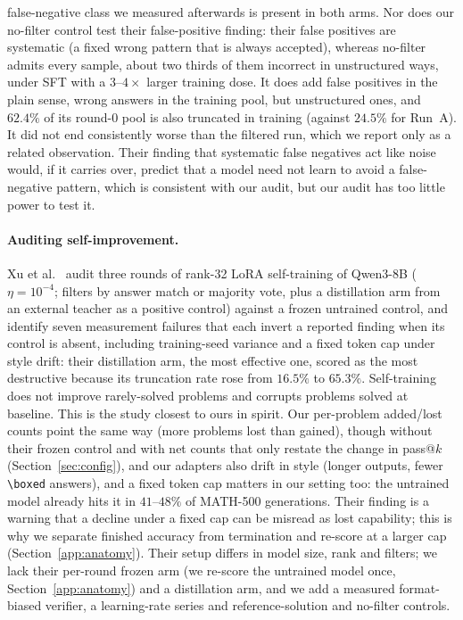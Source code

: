 \documentclass[runningheads]{llncs}
\begin{document}
false-negative class we measured afterwards is present in both arms. Nor does
our no-filter control test their false-positive finding: their false positives
are systematic (a fixed wrong pattern that is always accepted), whereas
no-filter admits every sample, about two thirds of them incorrect in
unstructured ways, under SFT with a $3$--$4\times$ larger training dose. It does
add false positives in the plain sense, wrong answers in the training pool,
but unstructured ones, and $62.4\%$ of its round-0 pool is also truncated in
training (against $24.5\%$ for Run~A). It did not end consistently worse than
the filtered run, which we report only as a related observation. Their finding
that systematic false negatives act like noise would, if it carries over,
predict that a model need not learn to avoid a false-negative pattern, which is
consistent with our audit, but our audit has too little power to test it.

\paragraph{Auditing self-improvement.}
Xu et al.~\cite{ref_phantom} audit three rounds of rank-32 LoRA self-training of
Qwen3-8B ($\eta=10^{-4}$; filters by answer match or majority vote, plus a
distillation arm from an external teacher as a positive control) against a
frozen untrained control, and identify seven measurement failures that each
invert a reported finding when its control is absent, including training-seed
variance and a fixed token cap under style drift: their distillation arm, the
most effective one, scored as the most destructive because its truncation rate
rose from $16.5\%$ to $65.3\%$.
Self-training does not improve rarely-solved problems and corrupts problems
solved at baseline. This is the study closest to ours in spirit. Our per-problem
added/lost counts point the same way (more problems lost than gained), though
without their frozen control and with net counts that only restate the change
in pass@$k$ (Section~\ref{sec:config}), and our
adapters also drift in style (longer outputs, fewer \verb|\boxed| answers), and
a fixed token cap matters in our setting too: the untrained model already hits
it in $41$--$48\%$ of MATH-500 generations. Their finding is a warning that a
decline under a fixed cap can be misread as lost capability; this is why we
separate finished accuracy from termination and re-score at a larger cap
(Section~\ref{app:anatomy}). Their setup differs in model size, rank and filters; we lack their
per-round frozen arm (we re-score the untrained model once,
Section~\ref{app:anatomy}) and a distillation arm, and we add a measured
format-biased verifier, a learning-rate series and reference-solution and
no-filter controls.
\end{document}
